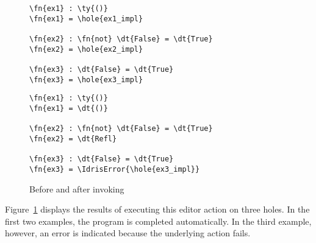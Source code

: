 \begin{figure}[h]
\begin{BVerbatim}
\fn{ex1} : \ty{()}
\fn{ex1} = \hole{ex1_impl}

\fn{ex2} : \fn{not} \dt{False} = \dt{True}
\fn{ex2} = \hole{ex2_impl}

\fn{ex3} : \dt{False} = \dt{True}
\fn{ex3} = \hole{ex3_impl}
\end{BVerbatim}
\hspace{1em}
\begin{BVerbatim}
\fn{ex1} : \ty{()}
\fn{ex1} = \dt{()}

\fn{ex2} : \fn{not} \dt{False} = \dt{True}
\fn{ex2} = \dt{Refl}

\fn{ex3} : \dt{False} = \dt{True}
\fn{ex3} = \IdrisError{\hole{ex3_impl}}
\end{BVerbatim}

  \caption{Before and after invoking }
  \label{fig:motivating-example-exec}
\end{figure}

Figure~\ref{fig:motivating-example-exec} displays the results of
executing this editor action on three holes. In the first two
examples, the program is completed automatically. In the third
example, however, an error is indicated because the underlying
 action fails.




